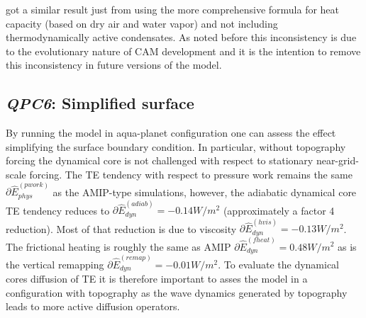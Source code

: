 \documentclass{agujournal}
\newcommand*{\gi}[1]{\widehat{#1}}
\begin{document}
\citet{T2011LNCSEb} got a similar result just from using the more comprehensive formula for heat capacity (based on dry air and water vapor) and not including thermodynamically active condensates. As noted before this inconsistency is due to the evolutionary nature of CAM development and it is the intention to remove this inconsistency in future versions of the model.



\subsection{{\em{QPC6}}: Simplified surface}\label{sec:QPC6}
By running the model in aqua-planet configuration one can assess the effect simplifying the surface boundary condition. In particular, without topography forcing the dynamical core is not challenged with respect to stationary near-grid-scale forcing. The TE tendency with respect to pressure work remains the same $\partial \gi{E}_{phys}^{({pwork})}$ as the AMIP-type simulations, however, the adiabatic dynamical core TE tendency reduces to $\partial \gi{E}_{dyn}^{({adiab})}=-0.14 W/m^2$ (approximately a factor 4 reduction). Most of that reduction is due to viscosity $\partial \gi{E}_{dyn}^{(hvis)}=-0.13 W/m^2$. The frictional heating is roughly the same as AMIP $\partial \gi{E}_{dyn}^{(fheat)}=0.48 W/m^2$ as is the vertical remapping  $\partial \gi{E}_{dyn}^{(remap)}=-0.01 W/m^2$. To evaluate the dynamical cores diffusion of TE it is therefore important to asses the model in a configuration with topography as the wave dynamics generated by topography leads to more active diffusion operators.
\end{document}
